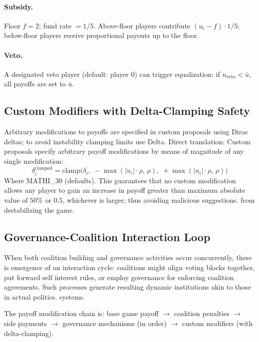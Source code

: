 \paragraph{Subsidy.} Floor $f = 2$; fund rate $= 1/5$. Above-floor
players contribute $(u_i - f) \cdot 1/5$; below-floor players receive
proportional payouts up to the floor.

\paragraph{Veto.} A designated veto player (default: player $0$) can
trigger equalization: if $u_{\text{veto}} < \bar{u}$, all payoffs are
set to $\bar{u}$.

\subsection{Custom Modifiers with Delta-Clamping Safety}
\label{sec:delta-clamping}

Arbitrary modifications to payoffs are specified in custom proposals using Dirac deltas; to avoid instability clamping limits use Delta. Direct translation: Custom proposals specify arbitrary payoff modifications by means of
magnitude of any single modification:
\[
\delta_i^{\text{clamped}} = \text{clamp}\!\bigl(\delta_i,\;
  -\max(|u_i| \cdot \rho,\, \rho),\;
  +\max(|u_i| \cdot \rho,\, \rho)\bigr)
\]
Where MATHI_30 (defaults). This guarantees that no custom modification allows any player to gain an increase in payoff greater than maximum absolute value of $50\%$ or $0.5$, whichever is larger; thus avoiding malicious suggestions.
from destabilizing the game.

\subsection{Governance-Coalition Interaction Loop}
\label{sec:gov-coalition}

When both coalition building and governance activities occur concurrently, there is emergence of an interaction cycle: coalitions might align voting blocks together, put forward self interest rules, or employ governance for enforcing coalition agreements. Such processes generate resulting dynamic institutions akin to those in actual politics.
systems.

The payoff modification chain is: base game payoff $\to$ coalition penalties
$\to$ side payments $\to$ governance mechanisms (in order) $\to$ custom
modifiers (with delta-clamping).

